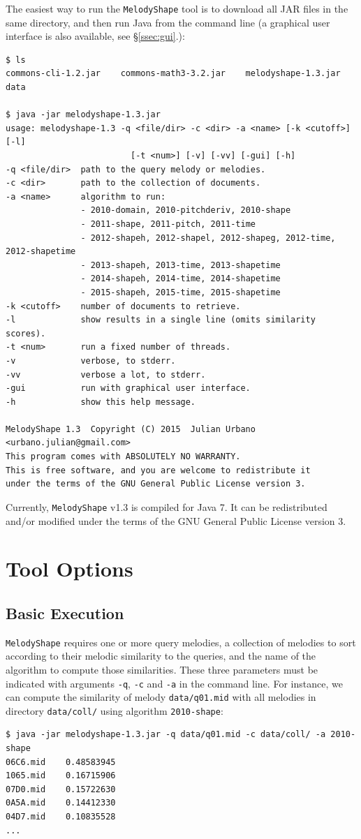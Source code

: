 \documentclass[twoside]{article}
\begin{document}
The easiest way to run the \texttt{MelodyShape} tool is to download all JAR files in the same directory, and then run Java from the command line (a graphical user interface is also available, see \S\ref{ssec:gui}.):
\begin{lstlisting}
$ ls
commons-cli-1.2.jar    commons-math3-3.2.jar    melodyshape-1.3.jar    data

$ java -jar melodyshape-1.3.jar
usage: melodyshape-1.3 -q <file/dir> -c <dir> -a <name> [-k <cutoff>] [-l]
                         [-t <num>] [-v] [-vv] [-gui] [-h]
-q <file/dir>  path to the query melody or melodies.
-c <dir>       path to the collection of documents.
-a <name>      algorithm to run:
               - 2010-domain, 2010-pitchderiv, 2010-shape
               - 2011-shape, 2011-pitch, 2011-time
               - 2012-shapeh, 2012-shapel, 2012-shapeg, 2012-time, 2012-shapetime
               - 2013-shapeh, 2013-time, 2013-shapetime
               - 2014-shapeh, 2014-time, 2014-shapetime
               - 2015-shapeh, 2015-time, 2015-shapetime
-k <cutoff>    number of documents to retrieve.
-l             show results in a single line (omits similarity scores).
-t <num>       run a fixed number of threads.
-v             verbose, to stderr.
-vv            verbose a lot, to stderr.
-gui           run with graphical user interface.
-h             show this help message.

MelodyShape 1.3  Copyright (C) 2015  Julian Urbano <urbano.julian@gmail.com>
This program comes with ABSOLUTELY NO WARRANTY.
This is free software, and you are welcome to redistribute it
under the terms of the GNU General Public License version 3.
\end{lstlisting}

Currently, \texttt{MelodyShape} v1.3 is compiled for Java 7. It can be redistributed and/or modified under the terms of the GNU General Public License version 3.

\section{Tool Options}

\subsection{Basic Execution}

\texttt{MelodyShape} requires one or more query melodies, a collection of melodies to sort according to their melodic similarity to the queries, and the name of the algorithm to compute those similarities. These three parameters must be indicated with arguments \texttt{-q}, \texttt{-c} and \texttt{-a} in the command line. For instance, we can compute the similarity of melody \texttt{data/q01.mid} with all melodies in directory \texttt{data/coll/} using algorithm \texttt{2010-shape}:
\begin{lstlisting}
$ java -jar melodyshape-1.3.jar -q data/q01.mid -c data/coll/ -a 2010-shape
06C6.mid    0.48583945
1065.mid    0.16715906
07D0.mid    0.15722630
0A5A.mid    0.14412330
04D7.mid    0.10835528
...
\end{lstlisting}
\end{document}
